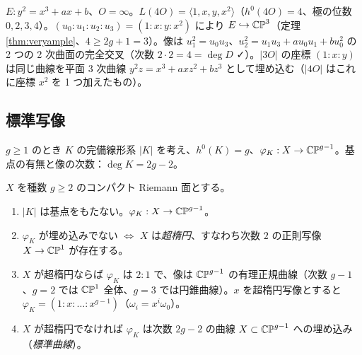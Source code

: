 \begin{ex}\label{ex:4O}
$E:y^2=x^3+ax+b$、$O=\infty$。$L(4O)=\langle1,x,y,x^2\rangle$（$h^0(4O)=4$、極の位数 $0,2,3,4$）。$(u_0:u_1:u_2:u_3)=(1:x:y:x^2)$ により $E\hookrightarrow\mathbb{CP}^3$（定理 \ref{thm:veryample}、$4\ge2g+1=3$）。像は $u_1^2=u_0u_3$、$u_2^2=u_1u_3+au_0u_1+bu_0^2$ の 2 つの 2 次曲面の完全交叉（次数 $2\cdot2=4=\deg D$ ✓）。$|3O|$ の座標 $(1:x:y)$ は同じ曲線を平面 3 次曲線 $y^2z=x^3+axz^2+bz^3$ として埋め込む（$|4O|$ はこれに座標 $x^2$ を 1 つ加えたもの）。\end{ex}

\subsection{標準写像}
$g\ge1$ のとき $K$ の完備線形系 $|K|$ を考え、$h^0(K)=g$、$\varphi_K:X\to\mathbb{CP}^{g-1}$。基点の有無と像の次数：$\deg K=2g-2$。
\begin{thm}\label{thm:canonical}
$X$ を種数 $g\ge2$ のコンパクト Riemann 面とする。
\begin{enumerate}
\item[(a)] $|K|$ は基点をもたない。$\varphi_K:X\to\mathbb{CP}^{g-1}$。
\item[(b)] $\varphi_K$ が埋め込みでない $\iff$ $X$ は\emph{超楕円}、すなわち次数 $2$ の正則写像 $X\to\mathbb{CP}^1$ が存在する。
\item[(c)] $X$ が超楕円ならば $\varphi_K$ は $2:1$ で、像は $\mathbb{CP}^{g-1}$ の有理正規曲線（次数 $g-1$、$g=2$ では $\mathbb{CP}^1$ 全体、$g=3$ では円錐曲線）。$x$ を超楕円写像とすると $\varphi_K=(1:x:\dots:x^{g-1})$（$\omega_i=x^i\omega_0$）。
\item[(d)] $X$ が超楕円でなければ $\varphi_K$ は次数 $2g-2$ の曲線 $X\subset\mathbb{CP}^{g-1}$ への埋め込み（\emph{標準曲線}）。
\end{enumerate}
\end{thm}
